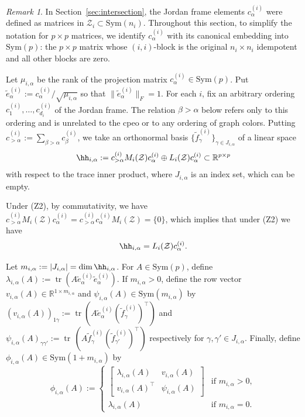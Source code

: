 \documentclass[12pt]{amsart}
\theoremstyle{plain}
\theoremstyle{definition}
\theoremstyle{remark}
\newtheorem{remark}[theorem]{Remark}
\newcommand{\R}{\mathbb{R}}
\newcommand{\1}{\mathbf{1}}
\newcommand{\tr}{\operatorname{tr}}
\newcommand{\mytransp}[1]{ #1^{\top}}
\begin{document}
 \begin{remark}
In Section~\ref{sec:intersection}, the Jordan frame elements $c_\alpha^{(i)}$
were defined as matrices in $\mathcal{Z}_i\subset \mathrm{Sym}(n_i)$. Throughout this section,
to simplify the notation for $p\times p$ matrices,
we identify $c_\alpha^{(i)}$ with its canonical embedding into
$\mathrm{Sym}(p)$: the $p \times p$ matrix whose $(i,i)$-block is
the original $n_i \times n_i$ idempotent and all other blocks are zero.
\end{remark}
 
Let $\mu_{i,\alpha}$ be the rank of the projection matrix
 $c^{(i)}_\alpha \in \mathrm{Sym}(p)$.
Put $\tilde{e}^{(i)}_\alpha :=  c^{(i)}_\alpha/\sqrt{\mu_{i,\alpha}}$
 so that $\| \tilde{e}^{(i)}_\alpha \|_F = 1$.
For each $i$, fix an arbitrary ordering $c_1^{(i)},\ldots,c_{d_i}^{(i)}$ of the Jordan frame. The relation $\beta>\alpha$ below refers only to this ordering and is unrelated to the cpeo or to any ordering of graph colors.
Putting $c^{(i)}_{>\alpha} := \sum_{\beta > \alpha} c^{(i)}_\beta$,
 we take an orthonormal basis $\{ \tilde{f}^{(i)}_\gamma \}_{\gamma \in J_{i,\alpha}}$
 of a linear space
 \begin{align}\label{eq:defhh}
    \hh_{i,\alpha} := c^{(i)}_{>\alpha} M_i(\mathcal{Z}) c^{(i)}_\alpha 
 \oplus L_i(\mathcal{Z}) c^{(i)}_\alpha \subset \R^{p \times p} 
  \end{align} 
 with respect to the trace inner product,
 where $J_{i,\alpha}$ is an index set, which can be empty.


 Under (Z2), by commutativity, we have $ c^{(i)}_{>\alpha} M_i(\mathcal{Z}) c^{(i)}_\alpha =  c^{(i)}_{>\alpha} c^{(i)}_\alpha  M_i(\mathcal{Z}) =\{0\}$, which implies that under (Z2) we have
 \begin{align}\label{eq:defhh_simple}
    \hh_{i,\alpha} = L_i(\mathcal{Z}) c^{(i)}_\alpha.
  \end{align} 
 
Let $m_{i,\alpha} := | J_{i,\alpha} | = \dim \hh_{i,\alpha}$. 
For $A \in \mathrm{Sym}(p)$,
 define 
 $\lambda_{i,\alpha}(A)
 := \tr(A \tilde{e}^{(i)}_{\alpha} \tilde{e}^{(i)}_{\alpha})$.
If $m_{i,\alpha} > 0$, 
 define the row vector $v_{i,\alpha}(A) \in \R^{1 \times m_{i,\alpha} }$
 and $\psi_{i,\alpha}(A) \in \mathrm{Sym}(m_{i,\alpha})$ by
 $(v_{i,\alpha}(A))_{1\gamma}
:= \tr (A \tilde{e}^{(i)}_{\alpha}  \mytransp{(\tilde{f}^{(i)}_\gamma)} )$
and
 $\psi_{i,\alpha}(A)_{\gamma \gamma'}
:= \tr\, (A\tilde{f}^{(i)}_{\gamma} \mytransp{ (\tilde{f}^{(i)}_{\gamma'}) })$
 respectively for $\gamma, \gamma' \in J_{i,\alpha}$.
Finally, 
 define $\phi_{i,\alpha}(A) \in \mathrm{Sym}(1 + m_{i,\alpha})$ by
\[
\phi_{i,\alpha}(A) := \begin{cases} 
\begin{bmatrix} \lambda_{i,\alpha}(A) & v_{i,\alpha}(A) \\
 \mytransp{v_{i,\alpha}(A)} & \psi_{i,\alpha}(A) \end{bmatrix}  & \mbox{if } m_{i,\alpha} >0,\\
\lambda_{i,\alpha}(A) & \mbox{if } m_{i,\alpha} = 0. 
\end{cases}
\]
\end{document}
